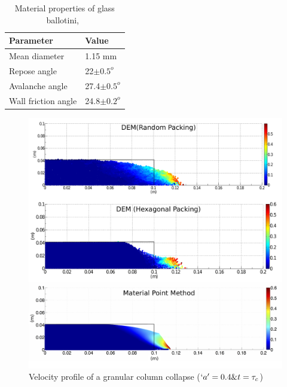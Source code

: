 \begin{table}[tbhp]
\caption{Material properties of glass ballotini,~\citep{Lajeunesse2005}}
\label{table:mat_prop}
\centering
\begin{tabular}{ll}
\toprule
\textbf{Parameter} & \textbf{Value} \\ \midrule
Mean diameter & 1.15 mm \\
Repose angle & 22$\pm 0.5^{o} $\\
Avalanche angle & 27.4$\pm 0.5^{o} $\\
Wall friction angle & 24.8$\pm 0.2^{o} $\\
\bottomrule
\end{tabular}
\end{table}

\begin{figure}[tbhp]
\centering
\includegraphics[width=\textwidth]{a04tc}
\caption{Velocity profile of a granular column collapse ($`a' = 0.4 \& 
t=\tau_c$)}
\label{fig:a04tc}
\end{figure}

